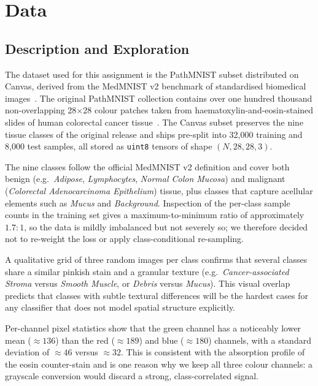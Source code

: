 \documentclass[../main.tex]{subfiles}
\begin{document}
\section{Data}

\subsection{Description and Exploration}
\noindent
The dataset used for this assignment is the PathMNIST subset distributed on
Canvas, derived from the MedMNIST v2 benchmark of standardised biomedical
images~\cite{yang2023medmnistv2}. The original PathMNIST collection contains
over one hundred thousand non-overlapping 28$\times$28 colour patches taken
from haematoxylin-and-eosin-stained slides of human colorectal cancer
tissue~\cite{kather2019colorectal}. The Canvas subset preserves the nine
tissue classes of the original release and ships pre-split into 32{,}000
training and 8{,}000 test samples, all stored as \texttt{uint8} tensors of
shape $(N, 28, 28, 3)$.

\noindent
The nine classes follow the official MedMNIST v2 definition and cover both
benign (e.g.~\emph{Adipose}, \emph{Lymphocytes}, \emph{Normal Colon Mucosa})
and malignant (\emph{Colorectal Adenocarcinoma Epithelium}) tissue, plus
classes that capture acellular elements such as \emph{Mucus} and
\emph{Background}. Inspection of the per-class sample counts in the training
set gives a maximum-to-minimum ratio of approximately $1.7\!:\!1$, so the
data is mildly imbalanced but not severely so; we therefore decided not to
re-weight the loss or apply class-conditional re-sampling.

\noindent
A qualitative grid of three random images per class confirms that several
classes share a similar pinkish stain and a granular texture
(e.g.~\emph{Cancer-associated Stroma} versus \emph{Smooth Muscle}, or
\emph{Debris} versus \emph{Mucus}). This visual overlap predicts that
classes with subtle textural differences will be the hardest cases for any
classifier that does not model spatial structure explicitly.

\noindent
Per-channel pixel statistics show that the green channel has a noticeably
lower mean ($\approx 136$) than the red ($\approx 189$) and blue ($\approx
180$) channels, with a standard deviation of $\approx 46$ versus $\approx
32$. This is consistent with the absorption profile of the eosin
counter-stain and is one reason why we keep all three colour channels: a
grayscale conversion would discard a strong, class-correlated signal.
\end{document}
